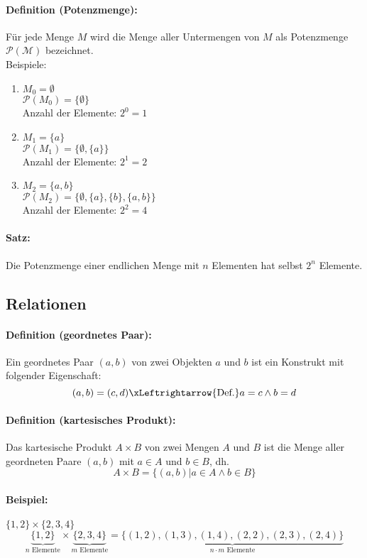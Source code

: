 \paragraph{Definition (Potenzmenge):}Für jede Menge $M$ wird die Menge aller Untermengen von $M$ als Potenzmenge $\mathcal{P(M)}$ bezeichnet.\\

Beispiele:
\begin{enumerate}
\item $M_0=\emptyset$ \\
$\mathcal{P}(M_0)=\{\emptyset\}$ \\
Anzahl der Elemente: $2^0=1$
\item $M_1=\{a\}$\\
$\mathcal{P}(M_1)=\{\emptyset,\{a\}\}$ \\
Anzahl der Elemente: $2^1=2$
\item $M_2=\{a,b\}$ \\
$\mathcal{P}(M_2)=\{\emptyset,\{a\},\{b\},\{a,b\}\}$ \\
Anzahl der Elemente: $2^2=4$
\end{enumerate}

\paragraph{Satz:}Die Potenzmenge einer endlichen Menge mit $n$ Elementen hat selbst $2^n$ Elemente.

\subsection{Relationen}
\paragraph{Definition (geordnetes Paar):}Ein geordnetes Paar $(a,b)$ von zwei Objekten $a$ und $b$ ist ein Konstrukt mit folgender Eigenschaft:
\[
(a,b) = (c,d) \xLeftrightarrow{\text{Def.}} a=c \land b=d
\]
\paragraph{Definition (kartesisches Produkt):}Das kartesische Produkt $A\times B$ von zwei Mengen $A$ und $B$ ist die Menge aller geordneten Paare $(a,b)$ mit $a\in A$ und $b\in B$, dh.
\[
A\times B = \{(a,b) | a\in A \land b\in B\}
\]

\paragraph{Beispiel:}$\{1,2\}\times \{2,3,4\}$
\[
\underbrace{ \{1,2\} }_{n\text{ Elemente}} \times \underbrace{ \{2,3,4\} }_{m\text{ Elemente}} = \underbrace{ \{ (1,2), (1,3), (1,4), (2,2), (2,3), (2,4) \} }_{n\cdot m\text{ Elemente}}
\]

